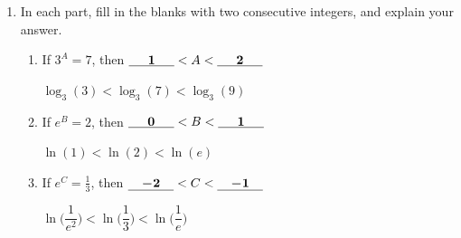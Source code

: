 \documentclass{article}
\begin{document}
\begin{enumerate}
  \begin{solution}
      \begin{itemize}
          \item It's not possible that $\displaystyle \lim_{x \to - \infty} f(x) = \infty$ because $f(x)$ increases on $(-\infty, 2)$. 
          \item It's not possible that $\displaystyle \lim_{x \to \infty}f(x) = 7$ because $f(x)$ increases and is concave up after $x=5$ ($\displaystyle \lim_{x \to \infty} f(x) = 7$ could be true if $f(x)$ increased and was concave down).
      \end{itemize}
  \end{solution}

\item 
  In each part, fill in the blanks with two consecutive integers, and explain your answer.
  \begin{enumerate}

  \item
    \begin{problem}[0.1in]
      If $3^A=7$, then $\cfitb{0.5in}{1} < A < \cfitb{0.5in}{2}$
    \end{problem}

    \begin{solution}
        $\log_3(3) < \log_3(7) < \log_3(9)$
    \end{solution}

  \item \label{estimate-ln2}
    \begin{problem}[0.1in]
      If $e^B=2$, then $\cfitb{0.5in}{0} < B < \cfitb{0.5in}{1}$
    \end{problem}

        \begin{solution}
        $\ln(1) < \ln(2) < \ln(e)$
    \end{solution}

  \item
    \begin{problem}[0.1in]
      If $e^C = \frac{1}{3}$, then $\displaystyle \cfitb{0.5in}{-2} < C < \cfitb{0.5in}{-1}$
    \end{problem}

            \begin{solution}
        $\ln\Big(\dfrac{1}{e^2}\Big) < \ln\Big(\dfrac{1}{3}\Big) < \ln\Big(\dfrac{1}{e}\Big)$
    \end{solution}

  \end{enumerate}




\end{enumerate}
\end{document}
